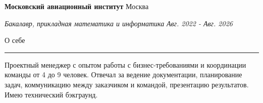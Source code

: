 \documentclass[14pt, a4paper, oneside]{extarticle}
\begin{document}

\begin{flushleft}
	\vspace{-0.8\intextsep}
	\quad
	\textbf{Московский авиационный институт}
	\hfill
	Москва
\end{flushleft}

\begin{flushleft}
	\vspace{-\intextsep}
	\quad
	\textit{Бакалавр, прикладная математика и информатика}
	\hfill
	\textit{\small Авг. 2022 - Авг. 2026}
\end{flushleft}


\begin{flushleft}
	\vspace{-\intextsep}
	\large О себе
\end{flushleft}

\vspace{-0.8\intextsep}
\hrule

\begin{sloppypar}
	\vspace{0.5\intextsep}
	\quad
	Проектный менеджер с опытом работы с бизнес-требованиями и координации команды от 4 до 9 человек. Отвечал за ведение документации, планирование задач, коммуникацию между заказчиком и командой, презентацию результатов. Имею технический бэкграунд.
\end{sloppypar}
\end{document}
